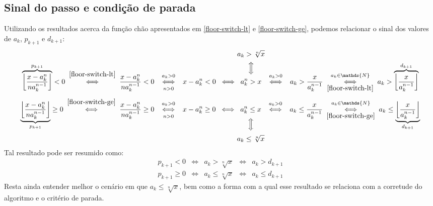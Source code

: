 \subsection*{Sinal do passo e condição de parada}

Utilizando os resultados acerca da função chão
apresentados em \eqref{floor-switch-lt} e \eqref{floor-switch-ge},
podemos relacionar o sinal dos valores de $a_k$, $p_{k+1}$ e $d_{k+1}$:
\[
  \overbrace{
    \left\lfloor \dfrac{x - a_k^n}{na_k^{n-1}} \right\rfloor
  }^{p_{k+1}} < 0
  \;\stackfirst{\eqref{floor-switch-lt}}{\iff}\;
  \dfrac{x - a_k^n}{na_k^{n-1}} < 0
  \;\stackfirst{a_k > 0}{
      \underset{n > 0\vphantom{\int}}{\iff}
    }\;
  x - a_k^n < 0
  \;\iff\;
  \overset{
    \mathclap{\substack{
      \displaystyle a_k > \sqrt[n]{x} \\[.5em]
      \displaystyle \Big\Updownarrow \\[.5em]
    }}
  }{a_k^n > x}
  \;\stackfirst{a_k > 0}{\iff}\;
  a_k > \dfrac{x}{a_k^{n-1}}
  \;\underset{\eqref{floor-switch-lt}}{
      \stackfirst{a_k \in \mathds{N}}{\iff}
    }\;
  a_k > \overbrace{
          \left\lfloor \dfrac{x}{a_k^{n-1}} \right\rfloor
        }^{d_{k+1}}
\]
\[
  \underbrace{
    \left\lfloor \dfrac{x - a_k^n}{na_k^{n-1}} \right\rfloor
  }_{p_{k+1}} \ge 0
  \;\stackfirst{\eqref{floor-switch-ge}}{\iff}\;
  \dfrac{x - a_k^n}{na_k^{n-1}} \ge 0
  \;\stackfirst{a_k > 0}{
      \underset{n > 0\vphantom{\int}}{\iff}
    }\;
  x - a_k^n \ge 0
  \;\iff\;
  \underset{
    \mathclap{\substack{\\[.4em]
      \displaystyle \Big\Updownarrow \\[.5em]
      \displaystyle a_k \le \sqrt[n]{x}
    }}
  }{a_k^n \le x}
  \;\stackfirst{a_k > 0}{\iff}\;
  a_k \le \dfrac{x}{a_k^{n-1}}
  \;\underset{\eqref{floor-switch-ge}}{
      \stackfirst{a_k \in \mathds{N}}{\iff}
    }\;
  a_k \le \underbrace{
            \left\lfloor \dfrac{x}{a_k^{n-1}} \right\rfloor
          }_{d_{k+1}}
\]
Tal resultado pode ser resumido como:
\[
  \begin{array}{lcccr}
    p_{k+1}   < 0 &\iff& a_k   > \sqrt[n]{x} &\iff& a_k   > d_{k+1} \\
    p_{k+1} \ge 0 &\iff& a_k \le \sqrt[n]{x} &\iff& a_k \le d_{k+1}
  \end{array}
\]
Resta ainda entender melhor o cenário em que $a_k \le \sqrt[n]{x}$,
bem como a forma com a qual esse resultado
se relaciona com a corretude do algoritmo e o critério de parada.

